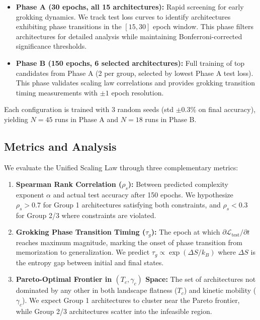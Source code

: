 \begin{itemize}
  \item \textbf{Phase A (30 epochs, all 15 architectures):} 
    Rapid screening for early grokking dynamics. We track test loss curves 
    to identify architectures exhibiting phase transitions in the 
    $[15, 30]$ epoch window. This phase filters architectures for detailed 
    analysis while maintaining Bonferroni-corrected significance thresholds.
    
  \item \textbf{Phase B (150 epochs, 6 selected architectures):}
    Full training of top candidates from Phase A (2 per group, selected by 
    lowest Phase A test loss). This phase validates scaling law correlations 
    and provides grokking transition timing measurements with $\pm 1$ epoch 
    resolution.
\end{itemize}

Each configuration is trained with 3 random seeds (std $\pm 0.3\%$ on final 
accuracy), yielding $N=45$ runs in Phase A and $N=18$ runs in Phase B.

\subsection{Metrics and Analysis}
\label{sec:metrics}

We evaluate the Unified Scaling Law through three complementary metrics:

\begin{enumerate}
  \item \textbf{Spearman Rank Correlation ($\rho_s$):}
    Between predicted complexity exponent $\alpha$ and actual test accuracy 
    after 150 epochs. We hypothesize $\rho_s > 0.7$ for Group 1 architectures 
    satisfying both constraints, and $\rho_s < 0.3$ for Group 2/3 where 
    constraints are violated.
    
  \item \textbf{Grokking Phase Transition Timing ($\tau_g$):}
    The epoch at which $\partial \mathcal{L}_{\text{test}}/\partial t$ reaches 
    maximum magnitude, marking the onset of phase transition from memorization 
    to generalization. We predict $\tau_g \propto \exp(\Delta S/k_B)$ where 
    $\Delta S$ is the entropy gap between initial and final states.
    
  \item \textbf{Pareto-Optimal Frontier in $(T_c, \gamma_c)$ Space:}
    The set of architectures not dominated by any other in both landscape 
    flatness ($T_c$) and kinetic mobility ($\gamma_c$). We expect Group 1 
    architectures to cluster near the Pareto frontier, while Group 2/3 
    architectures scatter into the infeasible region.
\end{enumerate}

